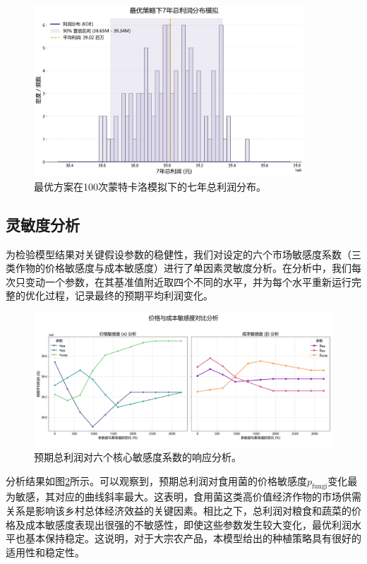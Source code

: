 \begin{figure}[H]
    \centering
    \includegraphics[width=0.9\textwidth]{figs/5问题三/利润分布图.png}
    \caption{最优方案在100次蒙特卡洛模拟下的七年总利润分布。}
    \label{fig:profit_dist}
\end{figure}

\subsection{灵敏度分析}
为检验模型结果对关键假设参数的稳健性，我们对设定的六个市场敏感度系数（三类作物的价格敏感度与成本敏感度）进行了单因素灵敏度分析。在分析中，我们每次只变动一个参数，在其基准值附近取四个不同的水平，并为每个水平重新运行完整的优化过程，记录最终的预期平均利润变化。

\begin{figure}[H]
    \centering
    \includegraphics[width=\textwidth]{figs/5问题三/灵敏度分析图.png}
    \caption{预期总利润对六个核心敏感度系数的响应分析。}
    \label{fig:sensitivity_analysis}
\end{figure}

分析结果如图\ref{fig:sensitivity_analysis}所示。可以观察到，预期总利润对食用菌的价格敏感度$p_{\text{fungi}}$变化最为敏感，其对应的曲线斜率最大。这表明，食用菌这类高价值经济作物的市场供需关系是影响该乡村总体经济效益的关键因素。相比之下，总利润对粮食和蔬菜的价格及成本敏感度表现出很强的不敏感性，即使这些参数发生较大变化，最优利润水平也基本保持稳定。这说明，对于大宗农产品，本模型给出的种植策略具有很好的适用性和稳定性。

